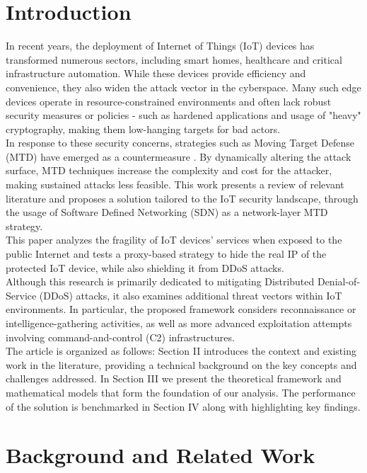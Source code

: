 \documentclass[conference]{IEEEtran}
\begin{document}
\section{Introduction}
In recent years, the deployment of Internet of Things (IoT) devices has transformed numerous sectors, including smart homes, healthcare and critical infrastructure automation. While these devices provide efficiency and convenience, they also widen the attack vector in the cyberspace\cite{sh_xenofontos2022}. Many such edge devices operate in resource-constrained environments and often lack robust security measures or policies\cite{sh_selvaraj2023} - such as hardened applications and usage of "heavy" cryptography, making them low-hanging targets for bad actors.  
\\
In response to these security concerns, strategies such as Moving Target Defense (MTD) have emerged as a countermeasure \cite{mtd_vol1}. By dynamically altering the attack surface, MTD techniques increase the complexity and cost for the attacker, making sustained attacks less feasible. This work presents a review of relevant literature and proposes a solution tailored to the IoT security landscape, through the usage of Software Defined Networking (SDN) as a network-layer MTD strategy. 
\\
This paper analyzes the fragility of IoT  devices' services when exposed to the public Internet and tests a proxy-based strategy to hide the real IP of the protected IoT device, while also shielding it from DDoS attacks.
\\
Although this research is primarily dedicated to mitigating Distributed Denial-of-Service (DDoS) attacks, it also examines additional threat vectors within IoT environments. In particular, the proposed framework considers reconnaissance or intelligence-gathering activities, as well as more advanced exploitation attempts involving command-and-control (C2) infrastructures.
\\
The article is organized as follows: Section II introduces the context and existing work in the literature, providing a technical background on the key concepts and challenges addressed. In Section III we present the theoretical framework and mathematical models that form the foundation of our analysis. The performance of the solution is benchmarked in Section IV along with highlighting key findings.

\section{Background and Related Work}
\end{document}
